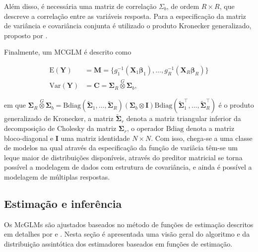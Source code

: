 Além disso, é necessária uma matriz de correlação $\Sigma_b$, de ordem $R \times R$, que descreve a correlação entre as variáveis resposta. Para a especificação da matriz de variância e covariância conjunta é utilizado o produto Kronecker generalizado, proposto por \citet{martinez13}.

Finalmente, um MCGLM é descrito como

\begin{equation}
\label{eq:mcglm}
      \begin{aligned}
        \mathrm{E}(\boldsymbol{Y}) &=
          \boldsymbol{M} =
            \{g_1^{-1}(\boldsymbol{X}_1 \boldsymbol{\beta}_1),
            \ldots,
            g_R^{-1}(\boldsymbol{X}_R \boldsymbol{\beta}_R)\}
          \\
        \mathrm{Var}(\boldsymbol{Y}) &=
          \boldsymbol{C} =
            \boldsymbol{\Sigma}_R \overset{G} \otimes
            \boldsymbol{\Sigma}_b,
      \end{aligned}
\end{equation}

\noindent em que $\boldsymbol{\Sigma}_R \overset{G} \otimes \boldsymbol{\Sigma}_b = \mathrm{Bdiag}(\tilde{\boldsymbol{\Sigma}}_1, \ldots, \tilde{\boldsymbol{\Sigma}}_R) (\boldsymbol{\Sigma}_b \otimes \boldsymbol{I}) \mathrm{Bdiag}(\tilde{\boldsymbol{\Sigma}}_1^\top, \ldots, \tilde{\boldsymbol{\Sigma}}_R^\top)$ é o produto generalizado de Kronecker, a matriz $\tilde{\boldsymbol{\Sigma}}_r$ denota a matriz triangular inferior da decomposição de Cholesky da matriz ${\boldsymbol{\Sigma}}_r$, o operador $\mathrm{Bdiag}$ denota a matriz bloco-diagonal e $\boldsymbol{I}$ uma matriz identidade $N \times N$. Com isso, chega-se a uma classe de modelos na qual através da especificação da função de variâcia têm-se um leque maior de distribuições disponíveis, através do preditor matricial se torna possível a modelagem de dados com estrutura de covariância, e ainda é possível a modelagem de múltiplas respostas.

\subsection{Estimação e inferência}

Os McGLMs são ajustados baseados no método de funções de estimação descritos em detalhes por \citet{Bonat16} e \citet{jorg04}. Nesta seção é apresentada uma visão geral do algoritmo e da distribuição assintótica dos estimadores baseados em funções de estimação.

